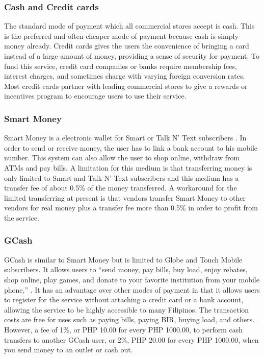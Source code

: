 \documentclass{acm_proc_article-sp}
\begin{document}
\subsubsection{Cash and Credit cards}
The standard mode of payment which all commercial stores accept is cash. This is the preferred and often cheaper mode of payment because cash is simply money already. Credit cards gives the users the convenience of bringing a card instead of a large amount of money, providing a sense of security for payment. To fund this service, credit card companies or banks require membership fees, interest charges, and sometimes charge with varying foreign conversion rates. Most credit cards partner with leading commercial stores to give a rewards or incentives program to encourage users to use their service.

\subsubsection{Smart Money}
Smart Money is a electronic wallet for Smart or Talk N' Text subscribers \cite{Smart:02092014}. In order to send or receive money, the user has to link a bank account to his mobile number. This system can also allow the user to shop online, withdraw from ATMs and pay bills. A limitation for this medium is that transferring money is only limited to Smart and Talk N' Text subscribers and this medium has a transfer fee of about 0.5\% of the money transferred. A workaround for the limited transferring at present is that vendors transfer Smart Money to other vendors for real money plus a transfer fee more than 0.5\% in order to profit from the service.

\subsubsection{GCash}
GCash is similar to Smart Money but is limited to Globe and Touch Mobile subscribers. It allows users to ``send money, pay bills, buy load, enjoy rebates, shop online, play games, and donate to your favorite institution from your mobile phone,'' \cite{Globe:02082014}. It has an advantage over other modes of payment in that it allows users to register for the service without attaching a credit card or a bank account, allowing the service to be highly accessible to many Filipinos. The transaction costs are free for uses such as paying bills, paying BIR, buying load, and others. However, a fee of 1\%, or PHP 10.00 for every PHP 1000.00, to perform cash transfers to another GCash user, or 2\%, PHP 20.00 for every PHP 1000.00, when you send money to an outlet or cash out. 
\end{document}

